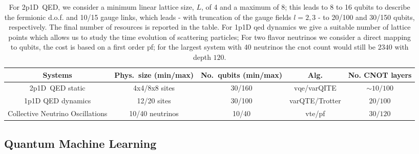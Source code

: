 \begin{table*}
\caption{ 
For \gls{2p1D}~QED, we consider a minimum linear lattice size, $L$, of 4 and a maximum of 8; this leads to 8 to 16 qubits to describe the fermionic d.o.f. and 10/15 gauge links, which leads - with truncation of the gauge fields $l=2,3$ - to 20/100 and 30/150 qubits, respectively. The final number of resources is reported in the table. For \gls{1p1D} \gls{qed} dynamics we give a suitable number of lattice points which allows us to study the time evolution of scattering particles;
For two flavor neutrinos we consider a direct mapping to qubits, the cost is based on a first order \gls{pf}; for the largest system with 40 neutrinos the \gls{cnot} count would still be $2340$ with depth $120$.
}
\label{table:resources}
\begin{tabular}{| c | c| c | c | c |} 
  \hline
  \textbf{Systems}                 & \textbf{Phys.~size (min/max)} & \textbf{No.~qubits  (min/max)} & \textbf{Alg.}           & \textbf{No. CNOT layers}\\ 
  \hline 
  \hline
  \gls{2p1D}~QED static            & 4x4/8x8 sites                 & 30/160                         & \gls{vqe}/\gls{varQITE} & $\sim 10/100$   \\
  \hline
  \gls{1p1D} QED dynamics          & 12/20 sites                   & 30/100                         & \gls{varQTE}/Trotter    & $20/100$  \\
  \hline
  Collective Neutrino Oscillations & 10/40 neutrinos               & 10/40                          & \gls{vte}/\gls{pf}      & $30/120$  \\
  \hline
\end{tabular}
\end{table*}


\subsection{Quantum Machine Learning}


